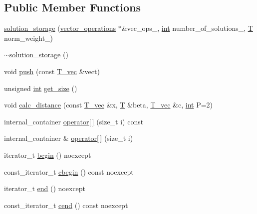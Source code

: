 \subsection*{Public Member Functions}
\begin{DoxyCompactItemize}
\item 
\hyperlink{classdeflation_1_1solution__storage_adecce4c3d4218f300d37868788c8e3a3}{solution\-\_\-storage} (\hyperlink{container__test_8cpp_aca3cc0310428d338f3a165c7823d6499}{vector\-\_\-operations} $\ast$\&vec\-\_\-ops\-\_\-, \hyperlink{classint}{int} number\-\_\-of\-\_\-solutions\-\_\-, \hyperlink{classdeflation_1_1solution__storage_af347bcf3081cfa0fcd03015ba347e964}{T} norm\-\_\-weight\-\_\-)
\item 
\hyperlink{classdeflation_1_1solution__storage_a127aed362fb24038630514bc734d9dcc}{$\sim$solution\-\_\-storage} ()
\item 
void \hyperlink{classdeflation_1_1solution__storage_a18a1e22432d0af885f4cd3bfeae25558}{push} (const \hyperlink{classdeflation_1_1solution__storage_ae65226dde857949785c573bf1bd448a7}{T\-\_\-vec} \&vect)
\item 
unsigned \hyperlink{classint}{int} \hyperlink{classdeflation_1_1solution__storage_a496846e61eaa4bb81aa24db49583c3c3}{get\-\_\-size} ()
\item 
void \hyperlink{classdeflation_1_1solution__storage_ae064d1a0a2770a18bceb0d3ef7f170fa}{calc\-\_\-distance} (const \hyperlink{classdeflation_1_1solution__storage_ae65226dde857949785c573bf1bd448a7}{T\-\_\-vec} \&x, \hyperlink{classdeflation_1_1solution__storage_af347bcf3081cfa0fcd03015ba347e964}{T} \&beta, \hyperlink{classdeflation_1_1solution__storage_ae65226dde857949785c573bf1bd448a7}{T\-\_\-vec} \&c, \hyperlink{classint}{int} P=2)
\item 
internal\-\_\-container \hyperlink{classdeflation_1_1solution__storage_a44cb133d29e8b31eca69ad2d1e928fbe}{operator\mbox{[}$\,$\mbox{]}} (size\-\_\-t i) const 
\item 
internal\-\_\-container \& \hyperlink{classdeflation_1_1solution__storage_aada80c39d7f948053447637ba5e627a0}{operator\mbox{[}$\,$\mbox{]}} (size\-\_\-t i)
\item 
iterator\-\_\-t \hyperlink{classdeflation_1_1solution__storage_a11b3fb51c30f923951a010eaeb8c66ad}{begin} () noexcept
\item 
const\-\_\-iterator\-\_\-t \hyperlink{classdeflation_1_1solution__storage_a3e607824090dc4953532bb34ab4cc0fb}{cbegin} () const noexcept
\item 
iterator\-\_\-t \hyperlink{classdeflation_1_1solution__storage_a70d440217ac68fd70dfc79701bb3ae9d}{end} () noexcept
\item 
const\-\_\-iterator\-\_\-t \hyperlink{classdeflation_1_1solution__storage_ac20328e89aa69182031e20839df800fa}{cend} () const noexcept
\end{DoxyCompactItemize}



